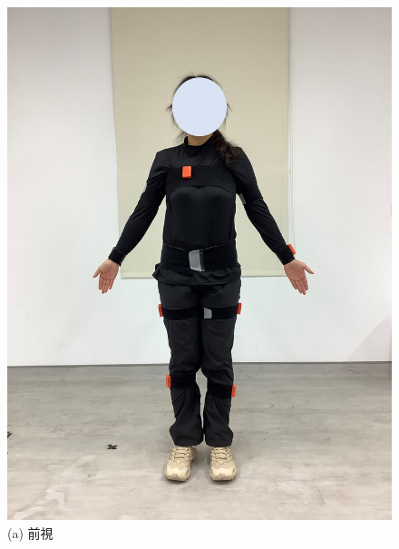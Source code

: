 \begin{figure}[!ht]
   \centering
   \begin{minipage}{.25\textwidth}
     \centering
     \includegraphics[width=.95\linewidth]{figure/ch3_fig_frontimu.JPG}
     \caption*{(a) 前視}
   \end{minipage}%
   \begin{minipage}{.25\textwidth}
      \centering

\end{minipage}
\end{figure}
